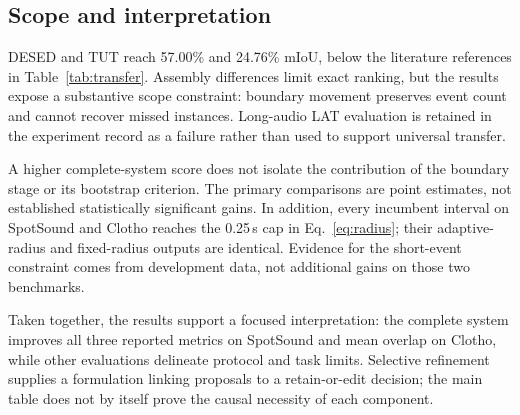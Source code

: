 \balance
\subsection{Scope and interpretation}
DESED and TUT reach 57.00\% and 24.76\% mIoU, below the literature references in Table~\ref{tab:transfer}. Assembly differences limit exact ranking, but the results expose a substantive scope constraint: boundary movement preserves event count and cannot recover missed instances. Long-audio LAT evaluation is retained in the experiment record as a failure rather than used to support universal transfer.

A higher complete-system score does not isolate the contribution of the boundary stage or its bootstrap criterion. The primary comparisons are point estimates, not established statistically significant gains. In addition, every incumbent interval on SpotSound and Clotho reaches the 0.25\,s cap in Eq.~\eqref{eq:radius}; their adaptive-radius and fixed-radius outputs are identical. Evidence for the short-event constraint comes from development data, not additional gains on those two benchmarks.

Taken together, the results support a focused interpretation: the complete system improves all three reported metrics on SpotSound and mean overlap on Clotho, while other evaluations delineate protocol and task limits. Selective refinement supplies a formulation linking proposals to a retain-or-edit decision; the main table does not by itself prove the causal necessity of each component.
